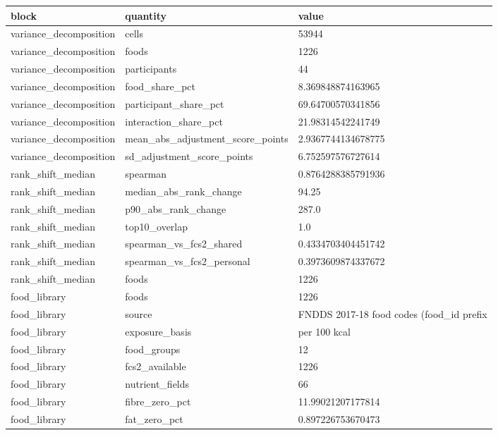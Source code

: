 {\footnotesize\setlength{\tabcolsep}{3pt}
\begin{longtable}{lll}
\toprule
\textbf{block} & \textbf{quantity} & \textbf{value} \\
\midrule
\endhead
variance\_decomposition & cells & 53944 \\
variance\_decomposition & foods & 1226 \\
variance\_decomposition & participants & 44 \\
variance\_decomposition & food\_share\_pct & 8.369848874163965 \\
variance\_decomposition & participant\_share\_pct & 69.64700570341856 \\
variance\_decomposition & interaction\_share\_pct & 21.98314542241749 \\
variance\_decomposition & mean\_abs\_adjustment\_score\_points & 2.9367744134678775 \\
variance\_decomposition & sd\_adjustment\_score\_points & 6.752597576727614 \\
rank\_shift\_median & spearman & 0.8764288385791936 \\
rank\_shift\_median & median\_abs\_rank\_change & 94.25 \\
rank\_shift\_median & p90\_abs\_rank\_change & 287.0 \\
rank\_shift\_median & top10\_overlap & 1.0 \\
rank\_shift\_median & spearman\_vs\_fcs2\_shared & 0.4334703404451742 \\
rank\_shift\_median & spearman\_vs\_fcs2\_personal & 0.3973609874337672 \\
rank\_shift\_median & foods & 1226 \\
food\_library & foods & 1226 \\
food\_library & source & FNDDS 2017-18 food codes (food\_id prefix \\
food\_library & exposure\_basis & per 100 kcal \\
food\_library & food\_groups & 12 \\
food\_library & fcs2\_available & 1226 \\
food\_library & nutrient\_fields & 66 \\
food\_library & fibre\_zero\_pct & 11.99021207177814 \\
food\_library & fat\_zero\_pct & 0.897226753670473 \\
\bottomrule
\end{longtable}}
